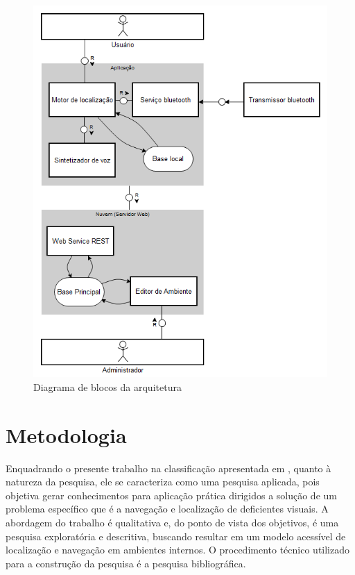 \documentclass[english,brazilian]{UNISINOSmonografia}
\begin{document}
\FloatBarrier 
\begin{figure}[!ht]
	\caption{Diagrama de blocos da arquitetura}
	\label{fig:arquitetura}
	\centering%
	\begin{minipage}{.8\textwidth}
		\includegraphics[width=\textwidth]{arquitetura.png}
	\end{minipage}
\end{figure}
\FloatBarrier 




\chapter{Metodologia}
Enquadrando o presente trabalho na classificação apresentada em , quanto à natureza da pesquisa, ele se caracteriza como uma pesquisa aplicada, pois objetiva gerar conhecimentos para aplicação prática dirigidos a solução de um problema específico que é a navegação e localização de deficientes visuais. A abordagem do trabalho é qualitativa e, do ponto de vista dos objetivos, é uma pesquisa exploratória e descritiva, buscando resultar em um modelo acessível de localização e navegação em ambientes internos. O procedimento técnico utilizado para a construção da pesquisa é a pesquisa bibliográfica.
\end{document}
